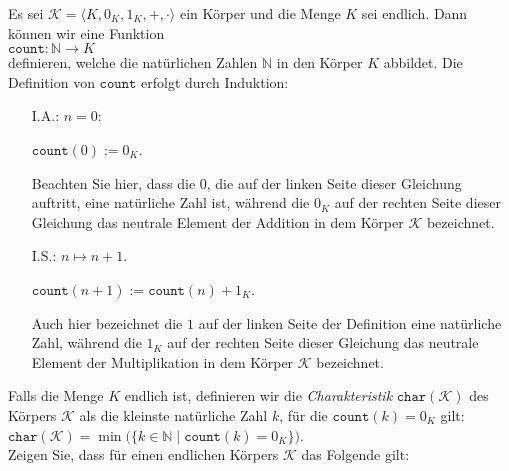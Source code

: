 \exerciseStar
Es sei $\mathcal{K} = \langle K, 0_K, 1_K, +, \cdot \rangle$ ein K\"{o}rper und die Menge $K$ sei endlich.
Dann k\"{o}nnen wir eine Funktion 
\\[0.2cm]
\hspace*{1.3cm}
$\mathtt{count}: \mathbb{N} \rightarrow K$
\\[0.2cm]
definieren, welche die nat\"{u}rlichen Zahlen $\mathbb{N}$ in den K\"{o}rper $K$ abbildet.  Die Definition
von $\mathtt{count}$ erfolgt durch Induktion:
\begin{enumerate}
\item[I.A.:] $n = 0$:

             $\mathtt{count}(0) := 0_K$.

             Beachten Sie hier, dass die $0$, die auf der linken Seite dieser Gleichung auftritt,
             eine nat\"{u}rliche Zahl ist, w\"{a}hrend die $0_K$ auf der rechten Seite dieser Gleichung
             das neutrale Element der Addition in dem K\"{o}rper $\mathcal{K}$ bezeichnet.
\item[I.S.:] $n \mapsto n + 1$.

             $\mathtt{count}(n+1) := \mathtt{count}(n) + 1_K$.

             Auch hier bezeichnet die $1$ auf der linken Seite der Definition eine nat\"{u}rliche Zahl,
             w\"{a}hrend die $1_K$ auf der rechten Seite dieser Gleichung das neutrale Element der
             Multiplikation in dem K\"{o}rper $\mathcal{K}$ bezeichnet.
\end{enumerate}
Falls die Menge $K$ endlich ist, definieren wir die {\color{blue}\emph{Charakteristik}}
$\mathtt{char}(\mathcal{K})$ des K\"{o}rpers $\mathcal{K}$ als die kleinste nat\"{u}rliche Zahl $k$, f\"{u}r die
$\mathtt{count}(k) = 0_K$ gilt:
\\[0.2cm]
\hspace*{1.3cm}
$\mathtt{char}(\mathcal{K}) = \min\bigl(\{ k \in \mathbb{N} \mid \mathtt{count}(k) = 0_K \}\bigr)$.
\\[0.2cm]
Zeigen Sie, dass f\"{u}r einen endlichen K\"{o}rpers $\mathcal{K}$ das Folgende gilt:
